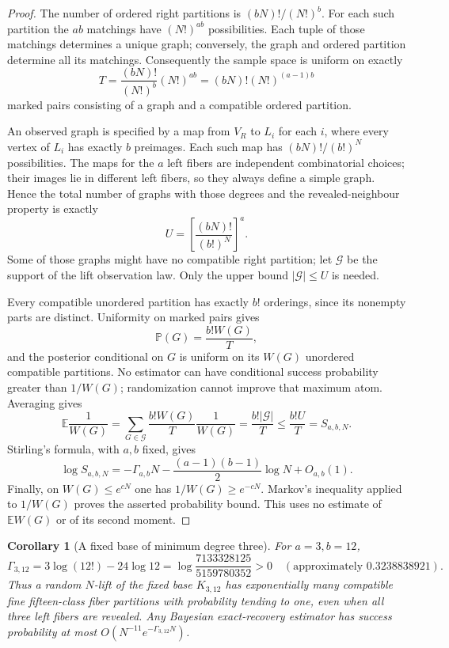 \documentclass[11pt]{article}
\newtheorem{corollary}{Corollary}
\newcommand{\Prb}{\mathbb P}
\newcommand{\E}{\mathbb E}
\begin{document}
\begin{proof}
The number of ordered right partitions is $(bN)!/(N!)^b$.
For each such partition the $ab$ matchings have $(N!)^{ab}$
possibilities. Each tuple of those matchings determines a unique graph;
conversely, the graph and ordered partition determine all its matchings.
Consequently the sample space is uniform on exactly
\[
 T=\frac{(bN)!}{(N!)^b}(N!)^{ab}
   =(bN)!(N!)^{(a-1)b}
\]
marked pairs consisting of a graph and a compatible ordered partition.

An observed graph is specified by a map from $V_R$ to $L_i$ for each
$i$, where every vertex of $L_i$ has exactly $b$ preimages. Each such
map has $(bN)!/(b!)^N$ possibilities. The maps for the $a$ left fibers
are independent combinatorial choices; their images lie in different
left fibers, so they always define a simple graph. Hence the total
number of graphs with those degrees and the revealed-neighbour property
is exactly
\[
 U=\left[\frac{(bN)!}{(b!)^N}\right]^a.
\]
Some of those graphs might have no compatible right partition; let
$\mathcal G$ be the support of the lift observation law. Only the
upper bound $|\mathcal G|\le U$ is needed.

Every compatible unordered partition has exactly $b!$ orderings,
since its nonempty parts are distinct. Uniformity on marked pairs gives
\[
 \Prb(G)=\frac{b!W(G)}T,
\]
and the posterior conditional on $G$ is uniform on its $W(G)$
unordered compatible partitions. No estimator can have conditional
success probability greater than $1/W(G)$; randomization cannot
improve that maximum atom. Averaging gives
\[
 \E\frac1{W(G)}
 =\sum_{G\in\mathcal G}\frac{b!W(G)}T\frac1{W(G)}
 =\frac{b!|\mathcal G|}T
 \le\frac{b!U}T=S_{a,b,N}.
\]
Stirling's formula, with $a,b$ fixed, gives
\[
 \log S_{a,b,N}=-\Gamma_{a,b}N
       -\frac{(a-1)(b-1)}2\log N+O_{a,b}(1).
\]
Finally, on $W(G)\le e^{cN}$ one has $1/W(G)\ge e^{-cN}$.
Markov's inequality applied to $1/W(G)$ proves the asserted probability
bound. This uses no estimate of $\E W(G)$ or of its second moment.
\end{proof}

\begin{corollary}[A fixed base of minimum degree three]
For $a=3,b=12$,
\[
 \Gamma_{3,12}=3\log(12!)-24\log12
 =\log\frac{7133328125}{5159780352}>0
 \quad(\text{approximately }0.3238838921).
\]
Thus a random $N$-lift of the fixed base $K_{3,12}$ has exponentially
many compatible fine fifteen-class fiber partitions with probability
tending to one, even when all three left fibers are revealed. Any
Bayesian exact-recovery estimator has success probability at most
$O(N^{-11}e^{-\Gamma_{3,12}N})$.
\end{corollary}
\end{document}
